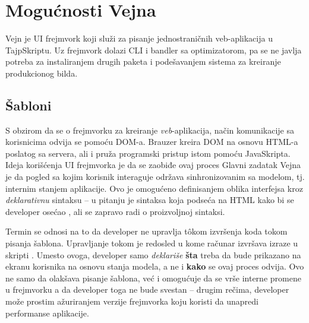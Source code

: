 \chapter{Mogućnosti Vejna}

Vejn je UI frejmvork koji služi za pisanje jednostraničnih veb-aplikacija u TajpSkriptu.
Uz frejmvork dolazi CLI i bandler sa optimizatorom, pa se ne javlja potreba za instaliranjem drugih paketa i podešavanjem sistema za kreiranje produkcionog bilda.

\section{Šabloni}





S obzirom da se o frejmvorku za kreiranje \emph{veb}-aplikacija, način komunikacije sa korisnicima odvija se pomoću DOM-a.
Brauzer kreira DOM na osnovu HTML-a poslatog sa servera, ali i pruža programski pristup istom pomoću JavaSkripta.
Ideja korišćenja UI frejmvorka je da se zaobiđe ovaj proces
Glavni zadatak Vejna je da pogled sa kojim korisnik interaguje održava sinhronizovanim sa modelom, tj. internim stanjem aplikacije.
Ovo je omogućeno definisanjem oblika interfejsa kroz \emph{deklarativnu} sintaksu -- u pitanju je sintaksa koja podseća na HTML kako bi se developer osećao , ali se zapravo radi o proizvoljnoj sintaksi.

Termin  se odnosi na to da developer ne upravlja t\^okom izvršenja koda tokom pisanja šablona.
Upravljanje tokom je redosled u kome računar izvršava izraze u skripti \cite{mdn:glossary:control-flow}.
Umesto ovoga, developer samo \emph{deklariše} \textbf{šta} treba da bude prikazano na ekranu korisnika na osnovu stanja modela, a ne i \textbf{kako} se ovaj proces odvija.
Ovo ne samo da olakšava pisanje šablona, već i omogućuje da se vrše interne promene u frejmvorku a da developer toga ne bude svestan -- drugim rečima, developer može prostim ažuriranjem verzije frejmvorka koju koristi da unapredi performanse aplikacije.


